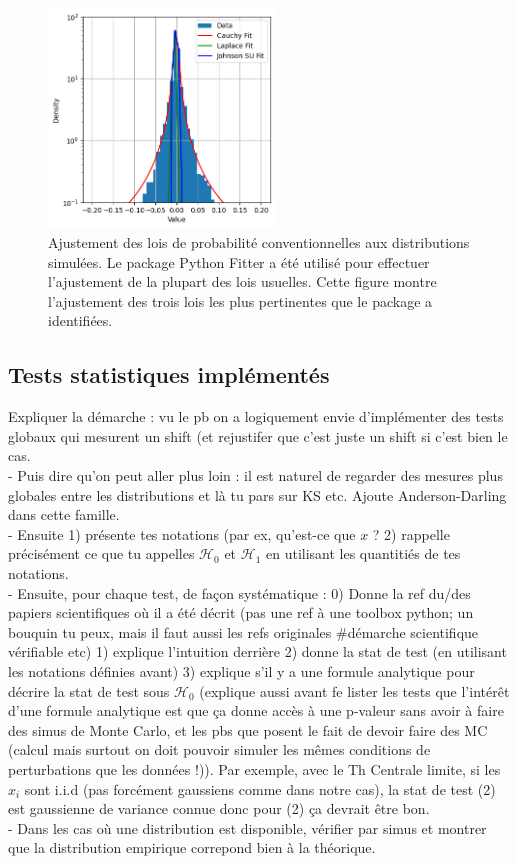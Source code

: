 \documentclass{article}
\newcommand{\dm}[1]{{\color{mulberry} #1}}
\begin{document}
\begin{figure}[H]
\centering
\includegraphics[width=6cm]{img/fits.png}
\caption{Ajustement des lois de probabilité conventionnelles aux distributions simulées. Le package Python Fitter a été utilisé pour effectuer l'ajustement de la plupart des lois usuelles. Cette figure montre l'ajustement des trois lois les plus pertinentes que le package a identifiées.}
\label{fig:fits}
\end{figure}



\subsection{Tests statistiques implémentés}

\dm{Expliquer la démarche : vu le pb on a logiquement envie d'implémenter  des tests globaux qui mesurent un shift (et rejustifer que c'est juste un shift si c'est bien le cas.\\
- Puis dire qu'on peut aller plus loin : il est naturel de regarder des mesures plus globales entre les distributions et là tu pars sur  KS etc. Ajoute Anderson-Darling dans cette famille.\\
- Ensuite 1) présente tes notations (par ex, qu'est-ce que $x$ ? 2) rappelle précisément ce que tu appelles $\mathcal{H}_0$ et $\mathcal{H}_1$ en utilisant les quantitiés de  tes notations.\\
- Ensuite, pour chaque test, de façon systématique : 0) Donne la ref du/des papiers scientifiques où il a été décrit (pas une ref à une toolbox python; un bouquin tu peux, mais il faut aussi les refs originales \#démarche scientifique vérifiable etc) 1) explique l'intuition derrière 2) donne la stat de test (en utilisant les notations définies avant) 3) explique s'il y a une formule analytique pour décrire la stat de test sous $\mathcal{H}_0$ (explique aussi avant fe lister les tests  que l'intérêt d'une formule analytique est  que ça donne accès à une p-valeur sans avoir à faire des simus de Monte Carlo, et les pbs que posent le fait de devoir faire des MC (calcul mais surtout on doit pouvoir simuler les mêmes conditions de perturbations que les données !)). Par exemple, avec le Th Centrale limite, si les $x_i$ sont i.i.d (pas forcément gaussiens comme dans notre cas), la stat de test (2) est gaussienne de variance connue donc pour (2) ça devrait être bon.\\
- Dans les cas où une distribution est disponible, vérifier par simus et montrer que la distribution empirique correpond bien à la théorique.}
\end{document}
